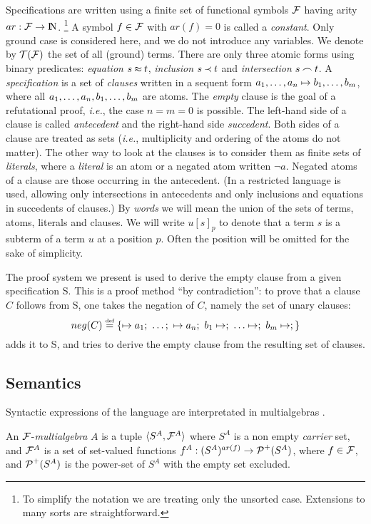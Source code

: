 Specifications are written using a finite set of functional symbols $\Funcs$
having arity $ar:\Funcs\to \Nat$. 
\footnote{To simplify the notation we are treating only the unsorted case. 
Extensions to many sorts are straightforward.}
A symbol $f\in\Funcs$ with $ar(f)=0$ is
called a {\em constant}.  Only ground case is considered here, and we do not
introduce any variables.  We denote by $\Terms\Funcs$ the set of all (ground)
terms.  There are only three atomic forms using binary predicates: {\em
equation} $s\Eq t$, {\em inclusion} $s\Incl t$ and {\em intersection} $s\Int
t$. A {\em specification} is a set of {\em clauses} written in a {sequent}
form $\List an,\Seq \List bm,$, where all $\List an,,\List bm,$ are atoms. The
{\em empty} clause is the goal of a refutational proof, {\em i.e.}, the case
$n=m=0$ is possible. The left-hand side of a clause is called {\em antecedent}
and the right-hand side {\em succedent}. Both sides of a clause are treated as
sets ({\em i.e.}, multiplicity and ordering of the atoms do not matter).  The
other way to look at the clauses is to consider them as finite sets of {\em
literals}, where a {\em literal} is an atom or a negated atom written \(\neg
a\). Negated atoms of a clause are those occurring in the antecedent.  (In
\cite{MW,Mich} a restricted language is used, allowing only intersections in
antecedents and only inclusions and equations in succedents of clauses.) By
{\em words} we will mean the union of the sets of terms, atoms, literals and
clauses.  We will write $u[s]_p$ to denote that a term $s$ is a subterm of a
term $u$ at a position $p$. Often the position will be omitted for the sake of
simplicity.


The proof system we present is used to derive the empty clause from a given
specification \C S. This is a proof method ``by contradiction'':
to prove that a clause $C$ follows from \C S, one takes the
negation of $C$, namely the set of unary clauses:
\[neg(C)\Def \{\List{\Seq a}n{;\ };\ \List bm{\Seq;\ }\Seq;\}\]
adds it to \C S, and tries to derive the empty clause from the resulting
set of clauses. 

\subsection{Semantics}

Syntactic expressions of the language are interpretated in {multialgebras}
\cite{Kap,Hus,Mich}.
\begin{DEFINITION}
An $\Funcs$-{\em multialgebra} $A$ is a tuple \(\<S^A,\Funcs^A\>\) where $S^A$
is a non empty {\em carrier} set, and $\Funcs^A$ is a set of set-valued functions
\(f^A: (S^A)^{ar(f)}\to\C P^+(S^A)\), where \(f\in \Funcs\), and \(\C P^+(S^A)\)
is the power-set of \(S^A\) with the empty set excluded.
\end{DEFINITION}

